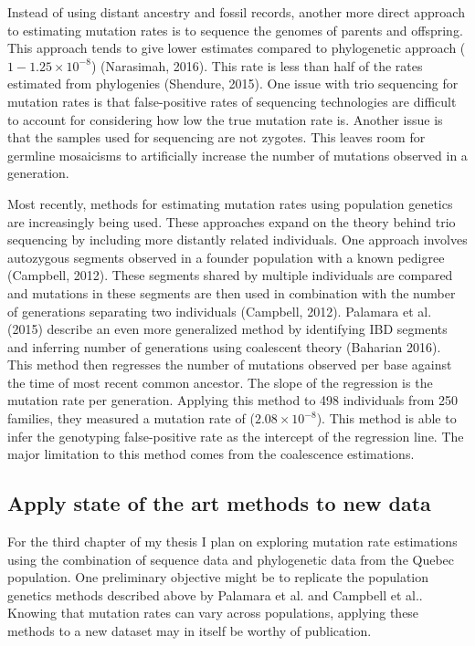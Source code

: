 \documentclass[
11pt, %
oneside, %
english, %
doublespacing, %
headsepline, %
]{MastersDoctoralThesis} %
\begin{document}
Instead of using distant ancestry and fossil records, another more direct approach to estimating mutation rates is to sequence the genomes of parents and offspring. 
This approach tends to give lower estimates compared to phylogenetic approach ($1-1.25\times10^{-8}$) (Narasimah, 2016).
This rate is less than half of the rates estimated from phylogenies (Shendure, 2015). 
One issue with trio sequencing for mutation rates is that false-positive rates of sequencing technologies are difficult to account for considering how low the true mutation rate is.
Another issue is that the samples used for sequencing are not zygotes.
This leaves room for germline mosaicisms to artificially increase the number of mutations observed in a generation.

Most recently, methods for estimating mutation rates using population genetics are increasingly being used.
These approaches expand on the theory behind trio sequencing by including more distantly related individuals.
One approach involves autozygous segments observed in a founder population with a known pedigree (Campbell, 2012).
These segments shared by multiple individuals are compared and mutations in these segments are then used in combination with the number of generations separating two individuals (Campbell, 2012).
Palamara et al. (2015) describe an even more generalized method by identifying IBD segments and inferring number of generations using coalescent theory (Baharian 2016).
This method then regresses the number of mutations observed per base against the time of most recent common ancestor.
The slope of the regression is the mutation rate per generation.
Applying this method to 498 individuals from 250 families, they measured a mutation rate of ($2.08\times10^{-8}$).
This method is able to infer the genotyping false-positive rate as the intercept of the regression line.
The major limitation to this method comes from the coalescence estimations.

\subsection{Apply state of the art methods to new data}
For the third chapter of my thesis I plan on exploring mutation rate estimations using the combination of sequence data and phylogenetic data from the Quebec population.
One preliminary objective might be to replicate the population genetics methods described above by Palamara et al. and Campbell et al..
Knowing that mutation rates can vary across populations, applying these methods to a new dataset may in itself be worthy of publication.
\end{document}
